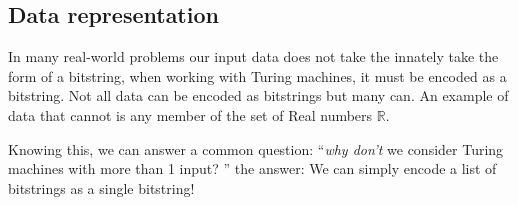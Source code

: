 \documentclass{article}
\begin{document}
    \subsection{Data representation}

    In many real-world problems our input data does not take the innately take the form of a bitstring, when working with Turing machines, it must be encoded as a bitstring. Not all data can be encoded as bitstrings but many can. An example of data that cannot is any member of the set of Real numbers $\mathbb{R}$.

    Knowing this, we can answer a common question: ``\textit{why don't} we consider Turing machines with more than 1 input? '' the answer: We can simply encode a list of bitstrings as a single bitstring!
\end{document}
